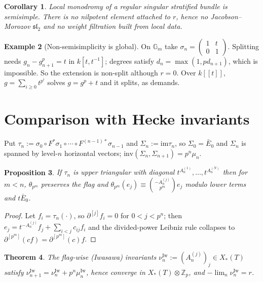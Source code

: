 \documentclass[11pt,reqno]{amsart}
\newcommand{\Zp}{\mathbb{Z}_p}
\newcommand{\GG}{\mathbb{G}}
\newcommand{\inv}{\mathrm{inv}}
\newcommand{\Iw}{\mathrm{Iw}}
\newcommand{\im}{\mathrm{im}}
\newcommand{\Xst}{X_*(T)}
\theoremstyle{plain}
\newtheorem{theorem}{Theorem}[section]
\newtheorem{proposition}[theorem]{Proposition}
\newtheorem{corollary}[theorem]{Corollary}
\theoremstyle{definition}
\newtheorem{example}[theorem]{Example}
\theoremstyle{remark}
\numberwithin{equation}{section}
\begin{document}
\begin{corollary}\label{cor:nounipotent}
Local monodromy of a regular singular stratified bundle is semisimple.
There is no nilpotent element attached to $r$, hence no Jacobson--Morozov
$\mathfrak{sl}_2$ and no weight filtration built from local data.
\end{corollary}

\begin{example}[Non-semisimplicity is global]\label{ex:globalext}
On $\GG_m$ take $\sigma_n=\left(\begin{smallmatrix}1&t\\0&1\end{smallmatrix}\right)$.
Splitting needs $g_n-g_{n+1}^p=t$ in $k[t,t^{-1}]$; degrees satisfy
$d_n=\max(1,pd_{n+1})$, which is impossible.  So the extension is
non-split although $r=0$.  Over $k[[t]]$, $g=\sum_{i\ge0}t^{p^i}$ solves
$g=g^p+t$ and it splits, as  demands.
\end{example}

\section{Comparison with Hecke invariants}\label{sec:comparison}

Put $\tau_n:=\sigma_0\circ F^*\sigma_1\circ\cdots\circ F^{(n-1)*}\sigma_{n-1}$
and $\Sigma_n:=\im\tau_n$, so $\Sigma_0=\bar E_0$ and $\Sigma_n$ is spanned
by level-$n$ horizontal vectors; $\inv(\Sigma_n,\Sigma_{n+1})=p^n\mu_n$.

\begin{proposition}\label{prop:flagres}
If $\tau_n$ is upper triangular with diagonal $t^{A^{(1)}_n},\dots,t^{A^{(N)}_n}$
then for $m<n$, $\theta_{p^m}$ preserves the flag and
$\theta_{p^m}(e_j)\equiv\binom{-A^{(j)}_n}{p^m}e_j$ modulo lower terms and
$t\bar E_0$.
\end{proposition}
\begin{proof}
Let $f_i=\tau_n(\cdot)$, so $\partial^{[j]}f_i=0$ for $0<j<p^n$; then
$e_j=t^{-A_n^{(j)}}f_j+\sum_{i<j}c_{ij}f_i$ and the divided-power Leibniz
rule collapses to $\partial^{[p^m]}(cf)=\partial^{[p^m]}(c)f$.
\end{proof}

\begin{theorem}\label{thm:comparison}
The flag-wise (Iwasawa) invariants $\nu^{\Iw}_n:=(A^{(j)}_n)_j\in\Xst$
satisfy $\nu^{\Iw}_{n+1}=\nu^{\Iw}_n+p^n\mu^{\Iw}_n$, hence converge in
$\Xst\otimes\Zp$, and $-\lim_n\nu^{\Iw}_n=r$.
\end{theorem}
\end{document}
